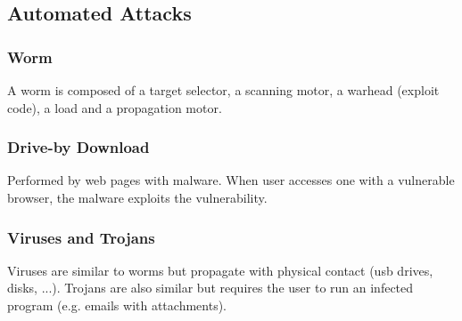 \documentclass[10pt,a4paper]{report}
\begin{document}
\subsection{Automated Attacks}
\subsubsection{Worm}
A worm is composed of a target selector, a scanning motor, a warhead (exploit code), a load and a propagation motor.
\subsubsection{Drive-by Download}
Performed by web pages with malware. When user accesses one with a vulnerable browser, the malware exploits the vulnerability.
\subsubsection{Viruses and Trojans}
Viruses are similar to worms but propagate with physical contact (usb drives, disks, ...). Trojans are also similar but requires the user to run an infected program (e.g. emails with attachments).
\end{document}
